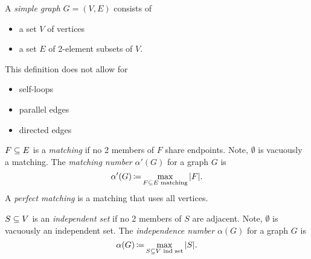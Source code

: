\begin{defn}
    \label{def:simple-graph}
    A \textit{simple graph} $G = (V, E)$ consists of 
    \begin{itemize}
        \item a set $V$ of vertices
        \item a set $E$ of 2-element subsets of $V$.
    \end{itemize}
    This definition does not allow for
    \begin{itemize}
        \item self-loops
        \item parallel edges
        \item directed edges
    \end{itemize}
\end{defn}

\begin{defn}[Matching]
    \label{def:matching}
    $F \subseteq E$ is a \textit{matching} if no 2 members of $F$ share endpoints. Note, $\emptyset$ is vacuously a matching. The \textit{matching number} $\alpha'(G)$ for a graph $G$ is
    \[
        \alpha'(G) \operatorname*{\coloneqq} \max_{F \subseteq E \text{ matching}} |F|.
    \]
    A \textit{perfect matching} is a matching that uses all vertices.
\end{defn}

\begin{defn}
    \label{def:independent-set}
    $S \subseteq V$ is an \textit{independent set} if no 2 members of $S$ are adjacent. Note, $\emptyset$ is vacuously an independent set. The \textit{independence number} $\alpha(G)$ for a graph $G$ is
    \[
        \alpha(G) \operatorname*{\coloneqq} \max_{S \subseteq V \text{ ind set}} |S|.
    \]
\end{defn}

